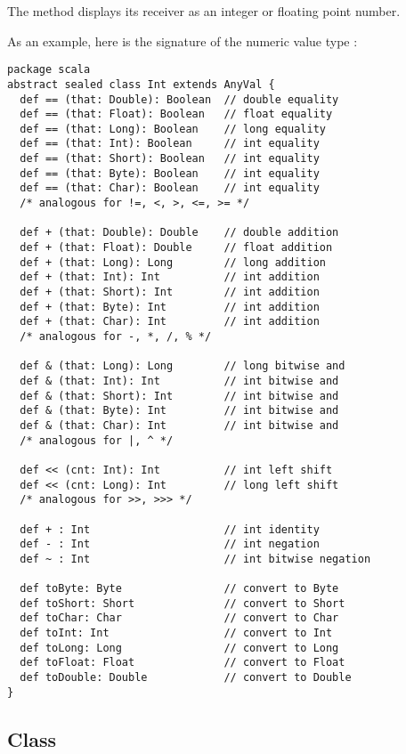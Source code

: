 {The  method displays its receiver as an integer or
floating point number.

\example As an example, here is the signature of the numeric value type :

\begin{lstlisting}
package scala 
abstract sealed class Int extends AnyVal {
  def == (that: Double): Boolean  // double equality
  def == (that: Float): Boolean   // float equality
  def == (that: Long): Boolean    // long equality
  def == (that: Int): Boolean     // int equality
  def == (that: Short): Boolean   // int equality
  def == (that: Byte): Boolean    // int equality
  def == (that: Char): Boolean    // int equality
  /* analogous for !=, <, >, <=, >= */

  def + (that: Double): Double    // double addition
  def + (that: Float): Double     // float addition
  def + (that: Long): Long        // long addition
  def + (that: Int): Int          // int addition
  def + (that: Short): Int        // int addition
  def + (that: Byte): Int         // int addition
  def + (that: Char): Int         // int addition
  /* analogous for -, *, /, % */
  
  def & (that: Long): Long        // long bitwise and
  def & (that: Int): Int          // int bitwise and
  def & (that: Short): Int        // int bitwise and
  def & (that: Byte): Int         // int bitwise and
  def & (that: Char): Int         // int bitwise and
  /* analogous for |, ^ */

  def << (cnt: Int): Int          // int left shift
  def << (cnt: Long): Int         // long left shift
  /* analogous for >>, >>> */

  def + : Int                     // int identity
  def - : Int                     // int negation
  def ~ : Int                     // int bitwise negation

  def toByte: Byte                // convert to Byte
  def toShort: Short              // convert to Short
  def toChar: Char                // convert to Char
  def toInt: Int                  // convert to Int
  def toLong: Long                // convert to Long
  def toFloat: Float              // convert to Float
  def toDouble: Double            // convert to Double
}
\end{lstlisting}

\subsection{Class \large{}}
\label{sec:cls-boolean}

}
